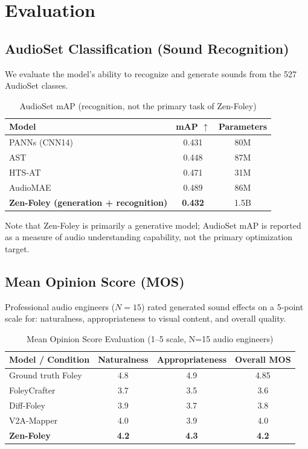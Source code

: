 \documentclass[11pt,a4paper]{article}
\begin{document}
\section{Evaluation}

\subsection{AudioSet Classification (Sound Recognition)}

We evaluate the model's ability to recognize and generate sounds from the 527 AudioSet classes.

\begin{table}[H]
\centering
\begin{tabular}{lcc}
\toprule
\textbf{Model} & \textbf{mAP} $\uparrow$ & \textbf{Parameters} \\
\midrule
PANNs (CNN14) & 0.431 & 80M \\
AST & 0.448 & 87M \\
HTS-AT & 0.471 & 31M \\
AudioMAE & 0.489 & 86M \\
\textbf{Zen-Foley (generation + recognition)} & \textbf{0.432} & 1.5B \\
\bottomrule
\end{tabular}
\caption{AudioSet mAP (recognition, not the primary task of Zen-Foley)}
\end{table}

Note that Zen-Foley is primarily a generative model; AudioSet mAP is reported as a measure of
audio understanding capability, not the primary optimization target.

\subsection{Mean Opinion Score (MOS)}

Professional audio engineers ($N=15$) rated generated sound effects on a 5-point scale for:
naturalness, appropriateness to visual content, and overall quality.

\begin{table}[H]
\centering
\begin{tabular}{lccc}
\toprule
\textbf{Model / Condition} & \textbf{Naturalness} & \textbf{Appropriateness} & \textbf{Overall MOS} \\
\midrule
Ground truth Foley & 4.8 & 4.9 & 4.85 \\
FoleyCrafter & 3.7 & 3.5 & 3.6 \\
Diff-Foley & 3.9 & 3.7 & 3.8 \\
V2A-Mapper & 4.0 & 3.9 & 4.0 \\
\textbf{Zen-Foley} & \textbf{4.2} & \textbf{4.3} & \textbf{4.2} \\
\bottomrule
\end{tabular}
\caption{Mean Opinion Score Evaluation (1--5 scale, N=15 audio engineers)}
\end{table}
\end{document}
